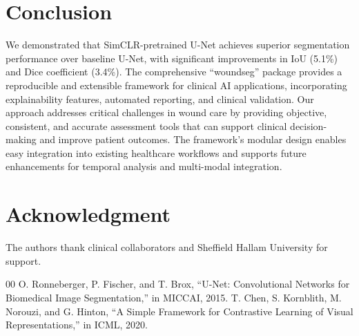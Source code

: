 \documentclass[conference]{IEEEtran}
\begin{document}
\section{Conclusion}
We demonstrated that SimCLR-pretrained U-Net achieves superior segmentation performance over baseline U-Net, with significant improvements in IoU (5.1\%) and Dice coefficient (3.4\%). The comprehensive ``woundseg'' package provides a reproducible and extensible framework for clinical AI applications, incorporating explainability features, automated reporting, and clinical validation. Our approach addresses critical challenges in wound care by providing objective, consistent, and accurate assessment tools that can support clinical decision-making and improve patient outcomes. The framework's modular design enables easy integration into existing healthcare workflows and supports future enhancements for temporal analysis and multi-modal integration.

\section*{Acknowledgment}
The authors thank clinical collaborators and Sheffield Hallam University for support.

\begin{thebibliography}{00}
 O. Ronneberger, P. Fischer, and T. Brox, ``U-Net: Convolutional Networks for Biomedical Image Segmentation,'' in MICCAI, 2015.
 T. Chen, S. Kornblith, M. Norouzi, and G. Hinton, ``A Simple Framework for Contrastive Learning of Visual Representations,'' in ICML, 2020.
\end{thebibliography}
\end{document}
